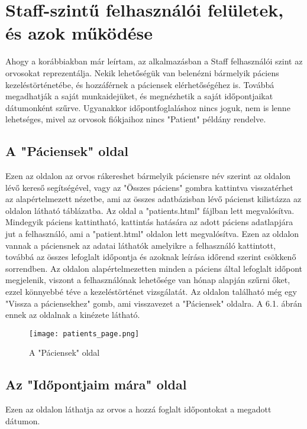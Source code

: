 \chapter{Staff-szintű felhasználói felületek, és azok működése}
\label{chap:fejezet6}

Ahogy a korábbiakban már leírtam, az alkalmazásban a Staff felhasználói szint az orvosokat reprezentálja. Nekik lehetőségük van belenézni bármelyik páciens kezeléstörténetébe, és hozzáférnek a páciensek elérhetőségéhez is. Továbbá megadhatják a saját munkaidejüket, és megnézhetik a saját időpontjaikat dátumonként szűrve. Ugyanakkor időpontfoglaláshoz nincs joguk, nem is lenne lehetséges, mivel az orvosok fiókjaihoz nincs "Patient" példány rendelve.

\section{A "Páciensek" oldal}

Ezen az oldalon az orvos rákereshet bármelyik páciensre név szerint az oldalon lévő kereső segítségével, vagy az "Összes páciens" gombra kattintva visszatérhet az alapértelmezett nézetbe, ami az összes adatbázisban lévő pácienst kilistázza az oldalon látható táblázatba. Az oldal a "patients.html" fájlban lett megvalósítva. Mindegyik páciens kattintható, kattintás hatására az adott páciens adatlapjára jut a felhasználó, ami a "patient.html" oldalon lett megvalósítva. Ezen az oldalon vannak a páciensnek az adatai láthatók amelyikre a felhasználó kattintott, továbbá az összes lefoglalt időpontja és azoknak leírása időrend szerint csökkenő sorrendben. Az oldalon alapértelmezetten minden a páciens által lefoglalt időpont megjelenik, viszont a felhasználónak lehetősége van hónap alapján szűrni őket, ezzel könnyebbé téve a kezeléstörténet vizsgálatát. Az oldalon található még egy "Vissza a páciensekhez" gomb, ami visszavezet a "Páciensek" oldalra. A 6.1. ábrán ennek az oldalnak a kinézete látható.

\begin{figure}[H]
	\caption{A "Páciensek" oldal}
	\label{fig:paciensek}
	\centering
	\texttt{[image: patients\_page.png]}
\end{figure}

\section{Az "Időpontjaim mára" oldal}

Ezen az oldalon láthatja az orvos a hozzá foglalt időpontokat a megadott dátumon.

